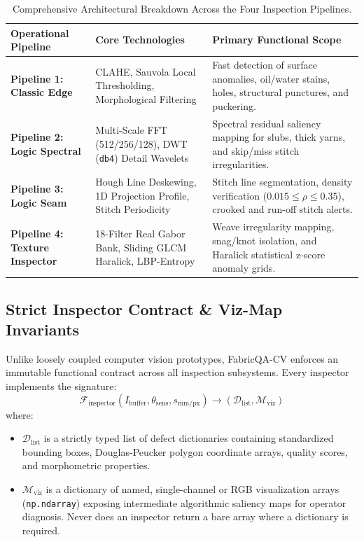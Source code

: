 \documentclass[10pt,a4paper]{article}
\begin{document}
\begin{table}[htbp]
\centering
\small
\begin{tabularx}{\textwidth}{l p{4.2cm} X}
\toprule
\textbf{Operational Pipeline} & \textbf{Core Technologies} & \textbf{Primary Functional Scope} \\
\midrule
\textbf{Pipeline 1: Classic Edge} & CLAHE, Sauvola Local Thresholding, Morphological Filtering & Fast detection of surface anomalies, oil/water stains, holes, structural punctures, and puckering. \\
\textbf{Pipeline 2: Logic Spectral} & Multi-Scale FFT (512/256/128), DWT (\texttt{db4}) Detail Wavelets & Spectral residual saliency mapping for slubs, thick yarns, and skip/miss stitch irregularities. \\
\textbf{Pipeline 3: Logic Seam} & Hough Line Deskewing, 1D Projection Profile, Stitch Periodicity & Stitch line segmentation, density verification ($0.015 \le \rho \le 0.35$), crooked and run-off stitch alerts. \\
\textbf{Pipeline 4: Texture Inspector} & 18-Filter Real Gabor Bank, Sliding GLCM Haralick, LBP-Entropy & Weave irregularity mapping, snag/knot isolation, and Haralick statistical z-score anomaly grids. \\
\bottomrule
\end{tabularx}
\caption{Comprehensive Architectural Breakdown Across the Four Inspection Pipelines.}
\label{tab:pipelines}
\end{table}

\subsection{Strict Inspector Contract \& Viz-Map Invariants}
Unlike loosely coupled computer vision prototypes, FabricQA-CV enforces an immutable functional contract across all inspection subsystems. Every inspector implements the signature:
\begin{equation}
\mathcal{F}_{\text{inspector}}(I_{\text{buffer}}, \theta_{\text{sens}}, s_{\text{mm/px}}) \longrightarrow \left( \mathcal{D}_{\text{list}}, \mathcal{M}_{\text{viz}} \right)
\end{equation}
where:
\begin{itemize}[leftmargin=1.5em,itemsep=2pt]
    \item $\mathcal{D}_{\text{list}}$ is a strictly typed list of defect dictionaries containing standardized bounding boxes, Douglas-Peucker polygon coordinate arrays, quality scores, and morphometric properties.
    \item $\mathcal{M}_{\text{viz}}$ is a dictionary of named, single-channel or RGB visualization arrays (\texttt{np.ndarray}) exposing intermediate algorithmic saliency maps for operator diagnosis. Never does an inspector return a bare array where a dictionary is required.
\end{itemize}
\end{document}
